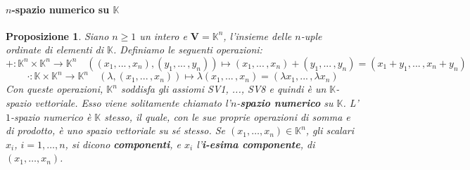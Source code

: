 \documentclass{article}
\theoremstyle{plain}
\newtheorem{prop}[thm]{Proposizione}
\theoremstyle{definition}
\theoremstyle{remark}
\begin{document}
\paragraph{$n$-spazio numerico su $\mathbb{K}$}
\begin{bxthm}
\begin{prop}
Siano \( n \geq 1 \) un intero e \( \mathbf{V} = \mathbb{K}^n \), l'insieme delle \( n \)-uple ordinate di elementi di \( \mathbb{K} \).
Definiamo le seguenti operazioni:
\[ +:\mathbb{K}^n\times \mathbb{K}^n\to \mathbb{K}^n\quad ((x_1, ...\, , x_n), (y_1, ...\, , y_n))\mapsto (x_1, ...\, , x_n)+(y_1, ...\, , y_n)=(x_1 + y_1, ...\,, x_n + y_n) \]
\[ \cdot:\mathbb{K}\times\mathbb{K}^n\to \mathbb{K}^n\quad (\lambda,(x_1, ...\, , x_n))\mapsto \lambda(x_1, ...\, , x_n)=(\lambda x_1, ...\, , \lambda x_n) \]
Con queste operazioni, \( \mathbb{K}^n \) soddisfa gli assiomi SV1, ..., SV8 e quindi è un $\mathbb{K}$-spazio vettoriale. 
Esso viene solitamente chiamato l'\( n \)-\textbf{spazio numerico} su \( \mathbb{K} \).
L'$1$-spazio numerico è \( \mathbb{K} \) stesso, il quale, con le sue proprie operazioni di somma e di prodotto, è uno spazio vettoriale su sé stesso.
Se \( (x_1, \ldots, x_n) \in \mathbb{K}^n \), gli scalari \( x_i \), \( i = 1, \ldots, n \), si dicono \textbf{componenti}, e \( x_i \) l'\textbf{i-esima componente}, di \( (x_1, \ldots, x_n) \).
\end{prop}
\end{bxthm}
\end{document}
